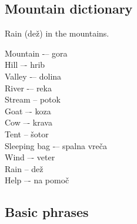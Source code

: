 \subsection{Mountain dictionary}


\begin{marginfigure}
\checkoddpage \ifoddpage \forcerectofloat \else \forceversofloat \fi
\centering
 \caption{Rain (dež) in the mountains. }
 \label{dež}
\end{marginfigure}

Mountain -– gora\\
Hill –- hrib\\
Valley -– dolina\\
River -– reka\\
Stream -- potok\\
Goat –- koza\\
Cow –- krava\\
Tent -- šotor\\
Sleeping bag -– spalna vreča\\
Wind –- veter\\
Rain -- dež\\
Help –- na pomoč\\

\subsection{Basic phrases}


